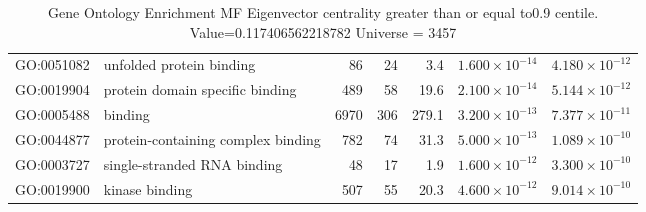 \begin{table}[ht]
\begin{adjustbox}{width=\textwidth}
\begin{tabular}{llrrrrr}
  GO:0051082 & unfolded protein binding & 86 & 24 & 3.4 & $1.600 \times 10^{-14}$ & $4.180 \times 10^{-12}$ \\ 
  GO:0019904 & protein domain specific binding & 489 & 58 & 19.6 & $2.100 \times 10^{-14}$ & $5.144 \times 10^{-12}$ \\ 
  GO:0005488 & binding & 6970 & 306 & 279.1 & $3.200 \times 10^{-13}$ & $7.377 \times 10^{-11}$ \\ 
  GO:0044877 & protein-containing complex binding & 782 & 74 & 31.3 & $5.000 \times 10^{-13}$ & $1.089 \times 10^{-10}$ \\ 
  GO:0003727 & single-stranded RNA binding & 48 & 17 & 1.9 & $1.600 \times 10^{-12}$ & $3.300 \times 10^{-10}$ \\ 
  GO:0019900 & kinase binding & 507 & 55 & 20.3 & $4.600 \times 10^{-12}$ & $9.014 \times 10^{-10}$ \\ 
   \hline
\end{tabular}
\end{adjustbox}
\caption{Gene Ontology Enrichment MF Eigenvector centrality  greater than or equal to0.9 centile.   Value=0.117406562218782 Universe = 3457} 
\label{tab:Gene Ontology Enrichment MF Eigenvector centrality  greater than or equal to0.9 centile.   Value=0.117406562218782 Universe = 3457}
\end{table}

